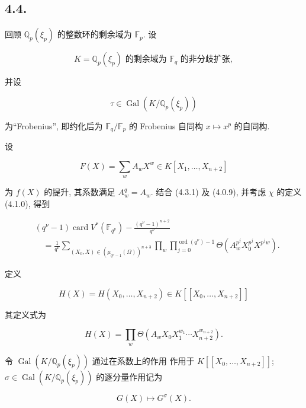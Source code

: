 \subsection*{4.4.}
回顾 $\mathbb Q_p(\xi_p)$ 的整数环的剩余域为 $\mathbb F_p$. 设

\begin{equation}\tag{4.4.0}
K=\text{$\mathbb Q_p(\xi_p)$ 的剩余域为 $\mathbb F_q$ 的非分歧扩张},
\end{equation}

并设

\begin{equation}\tag{4.4.1}
\tau\in\operatorname{Gal}(K/\mathbb Q_p(\xi_p))
\end{equation}

为“Frobenius”, 即约化后为 $\mathbb F_q/\mathbb F_p$ 的 Frobenius 自同构
$x\longmapsto x^p$ 的自同构.

设

\begin{equation}\tag{4.4.2}
F(X)=\sum_w A_wX^w\in K[X_1,\ldots,X_{n+2}]
\end{equation}

为 $f(X)$ 的提升, 其系数满足 $A_w^q=A_w$.
结合 (4.3.1) 及 (4.0.9), 并考虑 $\chi$ 的定义 (4.1.0), 得到

\begin{equation}\tag{4.4.3}
\begin{aligned}
&(q^\nu-1)\operatorname{card}V^*(\mathbb F_{q^\nu})
-\frac{(q^\nu-1)^{n+2}}{q^\nu}\\
&\quad=\frac1{q^\nu}
\sum_{(X_0,X)\in(\mu_{q^\nu-1}(\Omega))^{n+3}}
\prod_w\prod_{j=0}^{\operatorname{ord}(q^\nu)-1}
\Theta\!\left(A_w^{p^j}X_0^{p^j}X^{p^jw}\right).
\end{aligned}
\end{equation}

定义

\[
H(X)=H(X_0,\ldots,X_{n+2})\in K[[X_0,\ldots,X_{n+2}]]
\]

其定义式为

\begin{equation}\tag{4.4.4}
H(X)=\prod_w
\Theta\!\left(A_wX_0X_1^{w_1}\cdots X_{n+2}^{w_{n+2}}\right).
\end{equation}

令 $\operatorname{Gal}(K/\mathbb Q_p(\xi_p))$ 通过在系数上的作用
作用于 $K[[X_0,\ldots,X_{n+2}]]$;
$\sigma\in\operatorname{Gal}(K/\mathbb Q_p(\xi_p))$ 的逐分量作用记为

\begin{equation}\tag{4.4.5}
G(X)\longmapsto G^\sigma(X).
\end{equation}

